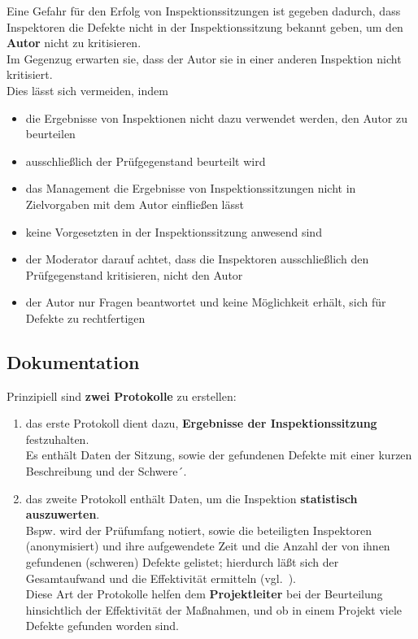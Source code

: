 \noindent
Eine Gefahr für den Erfolg von Inspektionssitzungen ist gegeben dadurch, dass Inspektoren die Defekte nicht in der Inspektionssitzung bekannt geben, um den \textbf{Autor} nicht zu kritisieren.\\
Im Gegenzug erwarten sie, dass der Autor sie in einer anderen Inspektion nicht kritisiert.\\
Dies lässt sich vermeiden, indem

\begin{itemize}
    \item die Ergebnisse von Inspektionen nicht dazu verwendet werden, den Autor zu beurteilen
    \item ausschließlich der Prüfgegenstand beurteilt wird
    \item das Management die Ergebnisse von Inspektionssitzungen nicht in Zielvorgaben mit dem Autor einfließen lässt
    \item keine Vorgesetzten in der Inspektionssitzung anwesend sind
    \item der Moderator darauf achtet, dass die Inspektoren ausschließlich den Prüfgegenstand kritisieren, nicht den Autor
    \item der Autor nur Fragen beantwortet und keine Möglichkeit erhält, sich für Defekte zu rechtfertigen
\end{itemize}

\subsection{Dokumentation}
Prinzipiell sind \textbf{zwei Protokolle} zu erstellen:

\begin{enumerate}
    \item das erste Protokoll dient dazu, \textbf{Ergebnisse der Inspektionssitzung} festzuhalten.\\
    Es enthält Daten der Sitzung, sowie der gefundenen Defekte mit einer kurzen Beschreibung und der Schwere´.
    \item das zweite Protokoll enthält Daten, um die Inspektion \textbf{statistisch auszuwerten}. \\
    Bspw. wird der Prüfumfang notiert, sowie die beteiligten Inspektoren (anonymisiert) und ihre aufgewendete Zeit und die Anzahl der von ihnen gefundenen (schweren) Defekte gelistet; hierdurch läßt sich der Gesamtaufwand und die Effektivität ermitteln (vgl.~\cite[Abb. 3.2, 22]{Wed09c}).\\
    Diese Art der Protokolle helfen dem \textbf{Projektleiter} bei der Beurteilung hinsichtlich der Effektivität der Maßnahmen, und ob in einem Projekt viele Defekte gefunden worden sind.
\end{enumerate}


